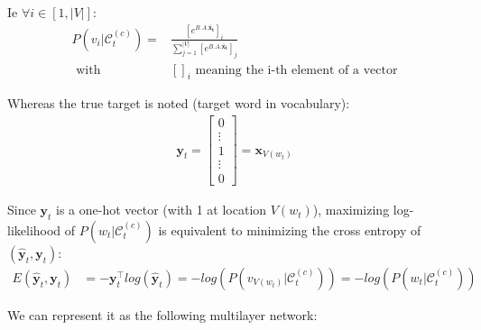 Ie $\forall i \in [1, |V|]$:
\begin{align}
 P(v_i | \mathcal{C}_t^{(c)})= 
 	&\frac{  [e^{B.A.\mathbf{\bar x_t}}]_i}
 	{\sum_{j=1}^{|V|} [e^{B.A.\mathbf{\bar x_t}} ]_j} \\
 	\text{      with}& []_i \text{ meaning the i-th element of a vector}
\end{align}


Whereas the true target is noted (target word in vocabulary):
\begin{align}
 \mathbf{y}_t = 
	\begin{bmatrix} 
		0 \\
		\vdots \\
		1 \\
		\vdots \\
		0
	\end{bmatrix} 
	= \mathbf{x}_{V(w_t)}
\end{align}


Since $\mathbf{y}_t$ is a one-hot vector (with 1 at location $V(w_t)$), maximizing log-likelihood of $P(w_t | \mathcal{C}_t^{(c)})$ is equivalent to minimizing the cross entropy of $(\mathbf{\hat y}_t, \mathbf{y}_t)$:
\begin{align}
E(\mathbf{\hat y}_t, \mathbf{y}_t) &= - \mathbf{y}_t^{\top} log(\mathbf{\hat y}_t) = - log(P(v_{V(w_t)} | \mathcal{C}_t^{(c)})) =- log(P(w_t | \mathcal{C}_t^{(c)}))
\end{align}

We can represent it as the following multilayer network:

